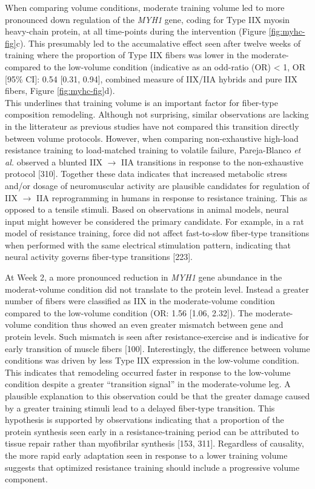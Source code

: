 \documentclass[twoside,10pt]{gihclass} %
\begin{document}
When comparing volume conditions, moderate training volume led to more pronounced down regulation of the \emph{MYH1} gene, coding for Type IIX myosin heavy-chain protein, at all time-points during the intervention (Figure \ref{fig:myhc-fig}c). This presumably led to the accumalative effect seen after twelve weeks of training where the proportion of Type IIX fibers was lower in the moderate- compared to the low-volume condition (indicative as an odd-ratio (OR) \textless{} 1, OR {[}95\% CI{]}: 0.54 {[}0.31, 0.94{]}, combined measure of IIX/IIA hybrids and pure IIX fibers, Figure \ref{fig:myhc-fig}d).\\
This underlines that training volume is an important factor for fiber-type composition remodeling. Although not surprising, similar observations are lacking in the litterateur as previous studies have not compared this transition directly between volume protocols.
However, when comparing non-exhaustive high-load resistance training to load-matched training to volatile failure, Pareja-Blanco \emph{et al.} observed a blunted IIX \(\rightarrow\) IIA transitions in response to the non-exhaustive protocol
{[}310{]}.
Together these data indicates that increased metabolic stress and/or dosage of neuromuscular activity are plausible candidates for regulation of IIX \(\rightarrow\) IIA reprogramming in humans in response to resistance training.
This as opposed to a tensile stimuli.
Based on observations in animal models, neural input might however be considered the primary candidate.
For example, in a rat model of resistance training, force did not affect fast-to-slow fiber-type transitions when performed with the same electrical stimulation pattern, indicating that neural activity governs fiber-type transitions
{[}223{]}.

At Week 2, a more pronounced reduction in \emph{MYH1} gene abundance in the moderat-volume condition did not translate to the protein level. Instead a greater number of fibers were classified as IIX in the moderate-volume condition compared to the low-volume condition (OR: 1.56 {[}1.06, 2.32{]}).
The moderate-volume condition thus showed an even greater mismatch between gene and protein levels.
Such mismatch is seen after resistance-exercise and is indicative for early transition of muscle fibers
{[}100{]}.
Interestingly, the difference between volume conditions was driven by less Type IIX expression in the low-volume condition.
This indicates that remodeling occurred faster in response to the low-volume condition despite a greater ``transition signal'' in the moderate-volume leg.
A plausible explanation to this observation could be that the greater damage caused by a greater training stimuli lead to a delayed fiber-type transition.
This hypothesis is supported by observations indicating that a proportion of the protein synthesis seen early in a resistance-training period can be attributed to tissue repair rather than myofibrilar synthesis
{[}153, 311{]}.
Regardless of causality, the more rapid early adaptation seen in response to a lower training volume suggests that optimized resistance training should include a progressive volume component.
\end{document}
